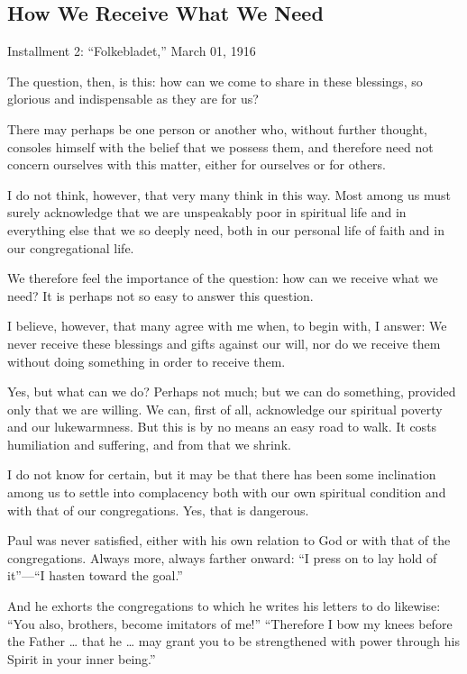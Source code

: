 
\subsection{How We Receive What We Need}

Installment 2: “Folkebladet,” March 01, 1916

The question, then, is this: how can we come to share in these blessings, so glorious and indispensable as they are for us?

There may perhaps be one person or another who, without further thought, consoles himself with the belief that we possess them, and therefore need not concern ourselves with this matter, either for ourselves or for others.

I do not think, however, that very many think in this way. Most among us must surely acknowledge that we are unspeakably poor in spiritual life and in everything else that we so deeply need, both in our personal life of faith and in our congregational life.

We therefore feel the importance of the question: how can we receive what we need? It is perhaps not so easy to answer this question.

I believe, however, that many agree with me when, to begin with, I answer: We never receive these blessings and gifts against our will, nor do we receive them without doing something in order to receive them.

Yes, but what can we do? Perhaps not much; but we can do something, provided only that we are willing. We can, first of all, acknowledge our spiritual poverty and our lukewarmness. But this is by no means an easy road to walk. It costs humiliation and suffering, and from that we shrink.

I do not know for certain, but it may be that there has been some inclination among us to settle into complacency both with our own spiritual condition and with that of our congregations. Yes, that is dangerous.

Paul was never satisfied, either with his own relation to God or with that of the congregations. Always more, always farther onward: “I press on to lay hold of it”—“I hasten toward the goal.”

And he exhorts the congregations to which he writes his letters to do likewise: “You also, brothers, become imitators of me!” “Therefore I bow my knees before the Father … that he … may grant you to be strengthened with power through his Spirit in your inner being.”

